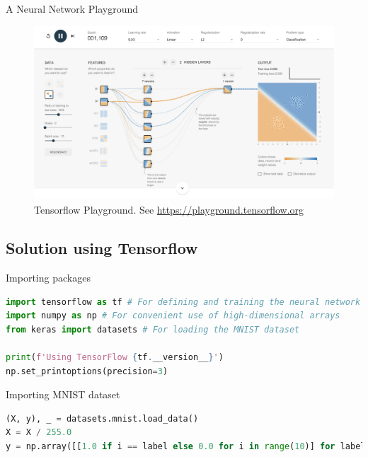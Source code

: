 \documentclass{beamer}
\begin{document}
     \begin{frame}{A Neural Network Playground}
        \begin{figure}
        \centering
            \includegraphics[width=\textwidth]{images/presentation/playground.png}
            \caption{Tensorflow Playground. See \href{https://playground.tensorflow.org}{https://playground.tensorflow.org}}
        \end{figure}
    \end{frame}

    \subsection{Solution using Tensorflow}
    \begin{frame}[fragile]{Importing packages}
        \begin{lstlisting}[language=Python, caption=Importing packages we would use]
import tensorflow as tf # For defining and training the neural network
import numpy as np # For convenient use of high-dimensional arrays
from keras import datasets # For loading the MNIST dataset

print(f'Using TensorFlow {tf.__version__}')
np.set_printoptions(precision=3)
        \end{lstlisting}
    
    \end{frame}

    \begin{frame}[fragile]{Importing MNIST dataset}
        \begin{lstlisting}[language=Python, caption=Importing the MNIST dataset]
(X, y), _ = datasets.mnist.load_data()
X = X / 255.0
y = np.array([[1.0 if i == label else 0.0 for i in range(10)] for label in y])
        \end{lstlisting}
    
    \end{frame}
\end{document}
